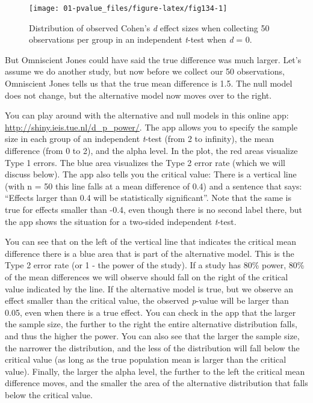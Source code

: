 \documentclass[
  oneside]{krantz}
\begin{document}
\begin{figure}

{\centering \texttt{[image: 01-pvalue\_files/figure-latex/fig134-1]} 

}

\caption{Distribution of observed Cohen's \emph{d} effect sizes when collecting 50 observations per group in an independent \emph{t}-test when \emph{d} = 0.}\label{fig:fig134}
\end{figure}

But Omniscient Jones could have said the true difference was much larger. Let's assume we do another study, but now before we collect our 50 observations, Omniscient Jones tells us that the true mean difference is 1.5. The null model does not change, but the alternative model now moves over to the right.



You can play around with the alternative and null models in this online app: \url{http://shiny.ieis.tue.nl/d_p_power/}. The app allows you to specify the sample size in each group of an independent \emph{t}-test (from 2 to infinity), the mean difference (from 0 to 2), and the alpha level. In the plot, the red areas visualize Type 1 errors. The blue area visualizes the Type 2 error rate (which we will discuss below). The app also tells you the critical value: There is a vertical line (with n = 50 this line falls at a mean difference of 0.4) and a sentence that says: ``Effects larger than 0.4 will be statistically significant''. Note that the same is true for effects smaller than -0.4, even though there is no second label there, but the app shows the situation for a two-sided independent \emph{t}-test.

You can see that on the left of the vertical line that indicates the critical mean difference there is a blue area that is part of the alternative model. This is the Type 2 error rate (or 1 - the power of the study). If a study has 80\% power, 80\% of the mean differences we will observe should fall on the right of the critical value indicated by the line. If the alternative model is true, but we observe an effect smaller than the critical value, the observed \emph{p}-value will be larger than 0.05, even when there is a true effect. You can check in the app that the larger the sample size, the further to the right the entire alternative distribution falls, and thus the higher the power. You can also see that the larger the sample size, the narrower the distribution, and the less of the distribution will fall below the critical value (as long as the true population mean is larger than the critical value). Finally, the larger the alpha level, the further to the left the critical mean difference moves, and the smaller the area of the alternative distribution that falls below the critical value.
\end{document}
